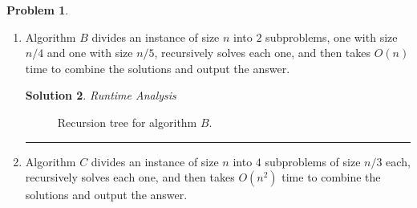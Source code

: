 \documentclass{article}
\theoremstyle{definition}
\newtheorem{problem}{Problem}
\def\fline{\rule{0.75\linewidth}{0.5pt}}
\newcommand{\finishline}{\begin{center}\fline\end{center}}
\newtheorem*{solution*}{Solution}
\newenvironment{solution}{\begin{solution*}}{{\finishline} \end{solution*}}
\begin{document}
\begin{problem}
\begin{enumerate}[label=(\Alph*)]
\begin{solution}
		\begin{figure}[h!]
			\centering
			\caption{Recursion tree for algorithm $A$.} 
		\end{figure}
		
\end{solution}

		\item Algorithm $B$ divides an instance of size $n$ into $2$ subproblems, one with size $n/4$ and one with size $n/5$, recursively solves each one, and then takes $O(n)$ time 
		to combine the solutions and output the answer. 
		
		    \begin{solution}
		    
		    	\emph{Runtime Analysis}
	
		\begin{figure}[h!]
			\centering
			\caption{Recursion tree for algorithm $B$.} 
		\end{figure}
		
\end{solution}

		\item Algorithm $C$ divides an instance of size $n$ into $4$ subproblems of size $n/3$ each, recursively solves each one, and then takes $O(n^2)$ time 
		to combine the solutions and output the answer. 
		

\end{enumerate}
\end{problem}
\end{document}
